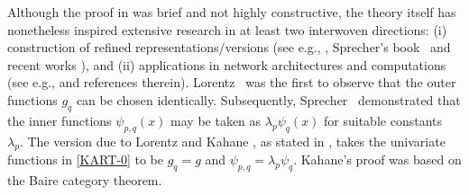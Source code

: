 \documentclass[10pt,reqno,final]{amsart}
\theoremstyle{remark}
\theoremstyle{definition}
\newcommand{\bs}[1]{\boldsymbol{#1}}
\newcommand{\wll}[1]{#1}
\begin{document}
Although the proof in \cite{Kolmogorov1957} was brief and not highly constructive, the theory \wll{itself}  has nonetheless inspired extensive research in at least two interwoven directions:  (i) construction of refined representations/versions 
(see e.g.,  \cite{Lorentz1962metric,Sprecher1963dissertation,Sprecher1965structure,Lorentz1966approximation,Kahane1975,Lorentz1996,Sprecher1996numerical,Sprecher1997numerical,Koppen2002,braun2009application}, Sprecher's book~\cite{Sprecher2017algebra} and recent works 
\cite{schmidt2021kolmogorov,Laczkovich2021superposition,ismayilova2024kolmogorov,Ismailov2024kart_uar_nn}), 
and  (ii) applications in network architectures and computations (see e.g., \cite{HechtNielsen1987,Girosi1989,Kourkova1991,Kuurkova1992kolmogorov,Igelnik2003,Guliyev2018approximation,Montanelli2020error,Shen2021three,He2024,Lai2024optimal,LaiShen2025Optimal,Liu2024KAN,Shukla2024comprehensive,toscano2025aivt,toscano2026,Toscano2024kkans,Guilhoto2025deep,toscano2026g} and references therein).  Lorentz~\cite{Lorentz1962metric} was the first to observe that the outer functions \( g_q \) can be chosen identically. Subsequently, Sprecher~\cite{Sprecher1963dissertation} demonstrated that the inner functions \( \psi_{p,q}(x) \) may be taken as \( \lambda_p \psi_q(x) \) for suitable constants $\lambda_p.$ \wll{The version due to Lorentz \cite{Lorentz1966approximation} and Kahane
\cite{Kahane1975}, as stated in \cite[Chapter~17]{Lorentz1996}, takes
the univariate functions in \eqref{KART-0} to be \(g_q = g\) and
\(\psi_{p,q} = \lambda_p \psi_q\). Kahane's proof was based on the
Baire category theorem.}
\end{document}

